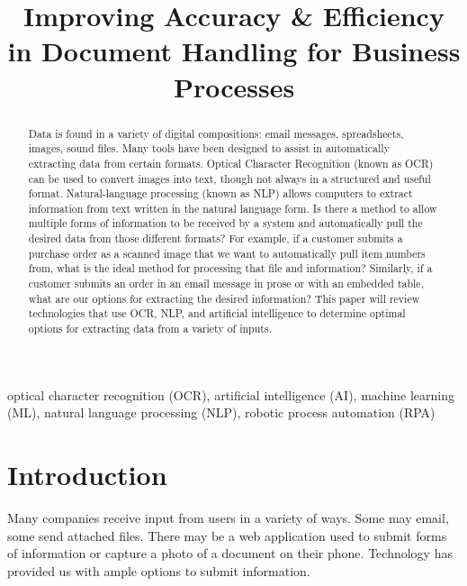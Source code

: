 \documentclass[conference]{IEEEtran}
\begin{document}
\title{Improving Accuracy \& Efficiency in Document Handling for Business Processes}

\author{
}

\maketitle

\begin{abstract}
Data is found in a variety of digital compositions: email messages, spreadsheets, images, sound files. Many tools have been designed to assist in automatically extracting data from certain formats. Optical Character Recognition (known as OCR) can be used to convert images into text, though not always in a structured and useful format. Natural-language processing (known as NLP) allows computers to extract information from text written in the natural language form. Is there a method to allow multiple forms of information to be received by a system and automatically pull the desired data from those different formats? For example, if a customer submits a purchase order as a scanned image that we want to automatically pull item numbers from, what is the ideal method for processing that file and information? Similarly, if a customer submits an order in an email message in prose or with an embedded table, what are our options for extracting the desired information? This paper will review technologies that use OCR, NLP, and artificial intelligence to determine optimal options for extracting data from a variety of inputs.
\end{abstract}

\begin{IEEEkeywords}
optical character recognition (OCR), artificial intelligence (AI), machine learning (ML), natural language processing (NLP), robotic process automation (RPA)
\end{IEEEkeywords}

\section{Introduction}
Many companies receive input from users in a variety of ways. Some may email, some send attached files. There may be a web application used to submit forms of information or capture a photo of a document on their phone. Technology has provided us with ample options to submit information.
\end{document}

